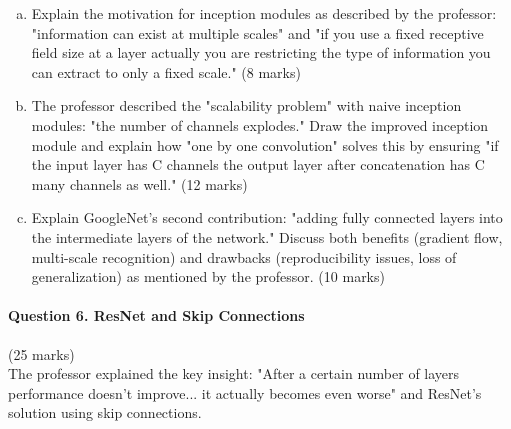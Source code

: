 \documentclass[12pt]{article}
\newcommand{\shortanswer}{\vspace{2cm}}
\newcommand{\mediumanswer}{\vspace{3cm}}
\begin{document}
\begin{enumerate}[(a)]
    \item Explain the motivation for inception modules as described by the professor: "information can exist at multiple scales" and "if you use a fixed receptive field size at a layer actually you are restricting the type of information you can extract to only a fixed scale." \hfill (8 marks)
    
    \mediumanswer
    
    \item The professor described the "scalability problem" with naive inception modules: "the number of channels explodes." Draw the improved inception module and explain how "one by one convolution" solves this by ensuring "if the input layer has C channels the output layer after concatenation has C many channels as well." \hfill (12 marks)
    
    \begin{center}
    \end{center}
    
    \shortanswer
    
    \item Explain GoogleNet's second contribution: "adding fully connected layers into the intermediate layers of the network." Discuss both benefits (gradient flow, multi-scale recognition) and drawbacks (reproducibility issues, loss of generalization) as mentioned by the professor. \hfill (10 marks)
    
    \mediumanswer
\end{enumerate}

\newpage
\paragraph{Question 6. ResNet and Skip Connections}{\hfill (25 marks)}\\
The professor explained the key insight: "After a certain number of layers performance doesn't improve... it actually becomes even worse" and ResNet's solution using skip connections.
\end{document}

